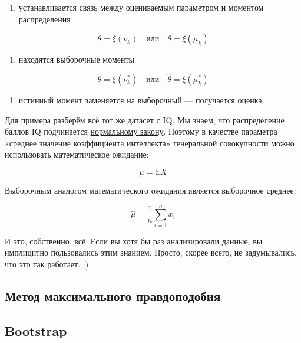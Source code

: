 \documentclass[
  letterpaper,
]{scrbook}
\providecommand{\tightlist}{%
  \setlength{\itemsep}{0pt}\setlength{\parskip}{0pt}}\usepackage{longtable,booktabs,array}
\theoremstyle{definition}
\theoremstyle{remark}
\begin{document}
\begin{enumerate}
\def\labelenumi{\arabic{enumi})}
\tightlist
\item
  устанавливается связь между оцениваемым параметром и моментом
  распределения
\end{enumerate}

\[
\theta = \xi(\nu_k) \quad \text{или} \quad \theta = \xi(\mu_k)
\]

\begin{enumerate}
\def\labelenumi{\arabic{enumi})}
\setcounter{enumi}{1}
\tightlist
\item
  находятся выборочные моменты
\end{enumerate}

\[
\hat \theta = \xi(\nu_k^*) \quad \text{или} \quad \hat \theta = \xi(\mu_k^*)
\]

\begin{enumerate}
\def\labelenumi{\arabic{enumi})}
\setcounter{enumi}{2}
\tightlist
\item
  истинный момент заменяется на выборочный --- получается оценка.
\end{enumerate}

Для примера разберём всё тот же датасет с IQ. Мы знаем, что
распределение баллов IQ подчинается
\hyperref[normal_distribution]{нормальному закону}. Поэтому в качестве
параметра «среднее значение коэффициента интеллекта» генеральной
совокупности можно использовать математическое ожидание:

\[
\mu = \mathbb{E}X
\]

Выборочным аналогом математического ожидания является выборочное
среднее:

\[
\hat \mu = \frac{1}{n} \sum_{i=1}^n x_i
\]

И это, собственно, всё. Если вы хотя бы раз анализировали данные, вы
имплицитно пользовались этим знанием. Просто, скорее всего, не
задумывались, что это так работает. :)

\subsection{Метод максимального
правдоподобия}\label{ux43cux435ux442ux43eux434-ux43cux430ux43aux441ux438ux43cux430ux43bux44cux43dux43eux433ux43e-ux43fux440ux430ux432ux434ux43eux43fux43eux434ux43eux431ux438ux44f}

\subsection{Bootstrap}\label{bootstrap}
\end{document}
